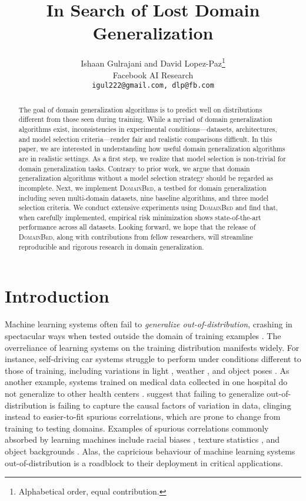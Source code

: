 \documentclass{article}
\title{In Search of Lost Domain Generalization}
\author{Ishaan Gulrajani and David Lopez-Paz\thanks{Alphabetical order, equal contribution.}\\
    Facebook AI Research\\
    \texttt{igul222@gmail.com, dlp@fb.com}
}
\newcommand{\domainbed}{\textsc{DomainBed}\xspace}
\begin{document}
\maketitle

\begin{abstract}
The goal of domain generalization algorithms is to predict well on distributions different from those seen during training.
While a myriad of domain generalization algorithms exist, inconsistencies in experimental conditions---datasets, architectures, and model selection criteria---render fair and realistic comparisons difficult.
In this paper, we are interested in understanding how useful domain generalization algorithms are in realistic settings.
As a first step, we realize that model selection is non-trivial for domain generalization tasks.
Contrary to prior work, we argue that domain generalization algorithms without a model selection strategy should be regarded as incomplete.
Next, we implement \domainbed, a testbed for domain generalization including seven multi-domain datasets, nine baseline algorithms, and three model selection criteria.
We conduct extensive experiments using \domainbed and find that, when carefully implemented, empirical risk minimization shows state-of-the-art performance across all datasets.
Looking forward, we hope that the release of \domainbed, along with contributions from fellow researchers, will streamline reproducible and rigorous research in domain generalization.
\end{abstract}

\section{Introduction}

Machine learning systems often fail to \emph{generalize out-of-distribution}, crashing in spectacular ways when tested outside the domain of training examples \citep{torralba2011unbiased}.
The overreliance of learning systems on the training distribution manifests widely.
For instance, self-driving car systems struggle to perform under conditions different to those of training, including variations in light \citep{dai2018dark}, weather \citep{volk2019towards}, and object poses \citep{alcorn2019strike}.
As another example, systems trained on medical data collected in one hospital do not generalize to other health centers \citep{castro2019causality, albadawy2018deep, perone2019unsupervised, mittech}.
\citet{arjovsky2019invariant} suggest that failing to generalize out-of-distribution is failing to capture the causal factors of variation in data, clinging instead to easier-to-fit spurious correlations, which are prone to change from training to testing domains.
Examples of spurious correlations commonly absorbed by learning machines include racial biases \citep{stock2018convnets}, texture statistics \citep{geirhos2018ImageNet}, and object backgrounds \citep{beery2018recognition}.
Alas, the capricious behaviour of machine learning systems out-of-distribution is a roadblock to their deployment in critical applications.
\end{document}
